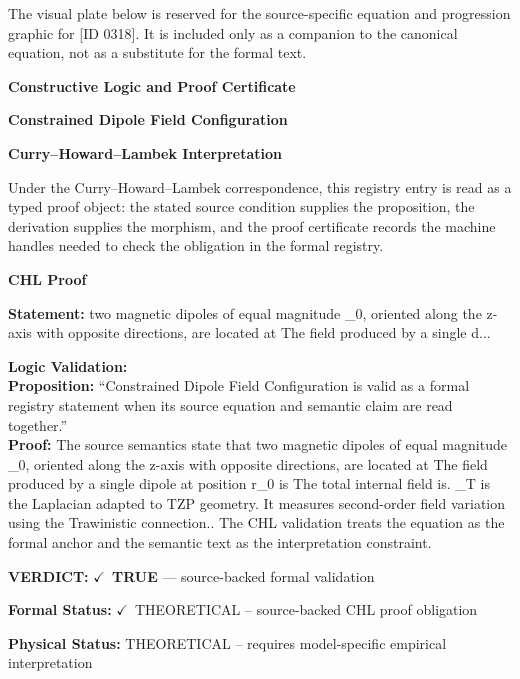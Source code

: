 \begingroup\footnotesize\sloppy
The visual plate below is reserved for the source-specific equation and progression graphic for [ID 0318]. It is included only as a companion to the canonical equation, not as a substitute for the formal text.
\par\endgroup
\ifTZPDarkEdition
{}
\fi

\clearpage
\begingroup\tzpsupportsetup
\noindent\textbf{\fontsize{10.8pt}{12.8pt}\selectfont [ID 0318] Constructive Logic and Proof Certificate}\par
\noindent\textbf{\fontsize{10pt}{12pt}\selectfont Constrained Dipole Field Configuration}\par
\vspace{0.45em}
\begingroup
\footnotesize
\setlength{\parskip}{0.22em}
\setlength{\parindent}{0pt}
\noindent\textbf{Curry--Howard--Lambek Interpretation}\par
Under the Curry--Howard--Lambek correspondence, this registry entry is read as a typed proof
object: the stated source condition supplies the proposition, the derivation supplies the
morphism, and the proof certificate records the machine handles needed to check the obligation
in the formal registry.

\vspace{0.45em}
\noindent\textbf{CHL Proof}\par
\textbf{Statement:} two magnetic dipoles of equal magnitude \_0, oriented along the z-axis with opposite
directions, are located at The field produced by a single d...

\textbf{Logic Validation:}\\
\textbf{Proposition:} ``Constrained Dipole Field Configuration is valid as a formal registry statement when its
source equation and semantic claim are read together.''\\
\textbf{Proof:} The source semantics state that two magnetic dipoles of equal magnitude \_0, oriented
along the z-axis with opposite directions, are located at The field produced by a
single dipole at position r\_0 is The total internal field is. \_T is the Laplacian
adapted to TZP geometry. It measures second-order field variation using the Trawinistic
connection.. The CHL validation treats the equation as the formal anchor and the
semantic text as the interpretation constraint.

\textbf{VERDICT:} \ensuremath{\checkmark}\ \textbf{TRUE} --- source-backed formal validation

\textbf{Formal Status:} \ensuremath{\checkmark}\ THEORETICAL -- source-backed CHL proof obligation

\textbf{Physical Status:} THEORETICAL -- requires model-specific empirical interpretation
\par\vspace{0.45em}
\par
\ifTZPDarkEdition
{}
\fi
\endgroup
\endgroup
